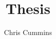 \documentclass[a4]{article}
\begin{document}
\title{Thesis}

\author{Chris Cummins}

\maketitle
\end{document}
